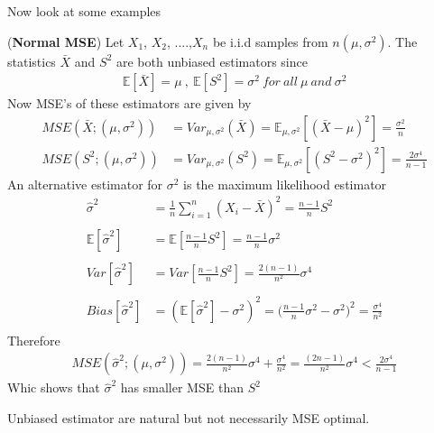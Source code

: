 \documentclass[a4paper,english,12pt]{article}
\begin{document}
Now look at some examples
\begin{exmp}(\textbf{Normal MSE})
Let $X_1$, $X_2$, ....,$X_n$ be i.i.d samples from $n(\mu , \sigma ^2)$. The statistics $\bar{X}$ and $S^2$ are both unbiased estimators since 
\begin{align*}
\mathbb{E}[\bar{X}] = \mu \ , \ \mathbb{E}[S^2] = \sigma ^2 \ for \ all \ \mu \ and \  \sigma ^2
\end{align*}
Now MSE's of these estimators are given by 
\begin{align*}
MSE(\bar{X} ; (\mu , \sigma ^2)) &= Var_{\mu , \sigma ^2}(\bar{X}) = \mathbb{E}_{\mu , \sigma ^ 2}[(\bar{X} - \mu)^2] = \frac{\sigma ^2}{n}\\
MSE(S^2 ; (\mu , \sigma ^2)) &= Var_{\mu , \sigma ^2}(S^2) = \mathbb{E}_{\mu , \sigma ^ 2}[(S^2 - \sigma ^2)^2] = \frac{2 \sigma ^4}{n - 1}
\end{align*}
An alternative estimator for $\sigma ^2$ is the maximum likelihood estimator
\begin{align*}
\hat{\sigma}^2 &= \frac{1}{n} \sum_{i=1}^{n}(X_i - \bar{X})^2 = \frac{n-1}{n} S^2\\\\
\mathbb{E}[\hat{\sigma}^2] &= \mathbb{E}[\frac{n-1}{n} S^2] = \frac{n-1}{n} \sigma ^2\\\\
Var[\hat{\sigma}^2] &= Var[\frac{n-1}{n} S^2] = \frac{2(n-1)}{n^2} \sigma ^4\\\\
Bias[\hat{\sigma}^2] &= (\mathbb{E}[\hat{\sigma}^2] - \sigma ^2)^2 =     \Big( \frac{n-1}{n} \sigma ^2 - \sigma ^2 \Big)^2 = \frac{\sigma ^4}{n^2}\\
\end{align*} 
Therefore
\begin{align*}
MSE(\hat{\sigma}^2 ; (\mu , \sigma ^2)) = \frac{2(n-1)}{n^2} \sigma ^4 + \frac{\sigma ^4}{n^2} = \frac{(2n-1)}{n^2} \sigma ^4 < \frac{2 \sigma ^4}{n-1}
\end{align*}
Whic shows that $\hat{\sigma}^2$ has smaller MSE than $S^2$ 
\end{exmp}
\begin{rem}
Unbiased estimator are natural but not necessarily MSE optimal.
\end{rem}
\end{document}
